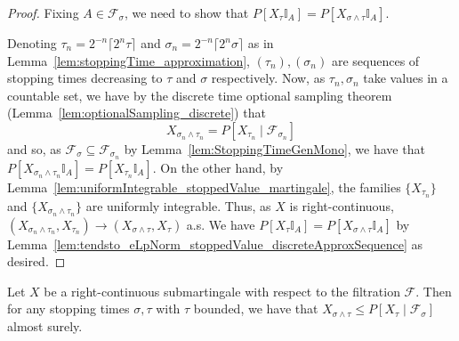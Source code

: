 \begin{proof}
  Fixing $A \in \mathcal{F}_{\sigma}$, we need to show that $P[X_{\tau} \mathbb{I}_A] = P[X_{\sigma \wedge \tau} \mathbb{I}_A]$.

  Denoting $\tau_n = 2^{-n} \lceil 2^n \tau \rceil$ and $\sigma_n = 2^{-n} \lceil 2^n \sigma \rceil$ as in
  Lemma~\ref{lem:stoppingTime_approximation}, $(\tau_n), (\sigma_n)$ are sequences of stopping times
  decreasing to $\tau$ and $\sigma$ respectively. Now, as $\tau_n, \sigma_n$ take values in a countable set,
  we have by the discrete time optional sampling theorem (Lemma~\ref{lem:optionalSampling_discrete}) that
  $$X_{\sigma_n \wedge \tau_n} = P[X_{\tau_n} \mid \mathcal{F}_{\sigma_n}]$$
  and so, as \(\mathcal{F}_{\sigma} \subseteq \mathcal{F}_{\sigma_n}\) by Lemma~\ref{lem:StoppingTimeGenMono},
  we have that $P[X_{\sigma_n \wedge \tau_n} \mathbb{I}_A] = P[X_{\tau_n} \mathbb{I}_A]$.
  On the other hand, by Lemma~\ref{lem:uniformIntegrable_stoppedValue_martingale}, the families $\{X_{\tau_n}\}$ and $\{X_{\sigma_n \wedge \tau_n}\}$ are uniformly integrable.
  Thus, as $X$ is right-continuous, $(X_{\sigma_n \wedge \tau_n}, X_{\tau_n}) \to (X_{\sigma \wedge \tau}, X_{\tau})$ a.s.
  We have $P[X_{\tau} \mathbb{I}_A] = P[X_{\sigma \wedge \tau} \mathbb{I}_A]$
  by Lemma~\ref{lem:tendsto_eLpNorm_stoppedValue_discreteApproxSequence} as desired.
\end{proof}

\begin{lemma}\label{lem:optionalSamplingSubmartingale}
  \leanok
  Let $X$ be a right-continuous submartingale with respect to the filtration $\mathcal{F}$. Then for
  any stopping times $\sigma, \tau$ with $\tau$ bounded, we have that
  $X_{\sigma \wedge \tau} \le P[X_{\tau} \mid \mathcal{F}_{\sigma}]$ almost surely.
\end{lemma}

